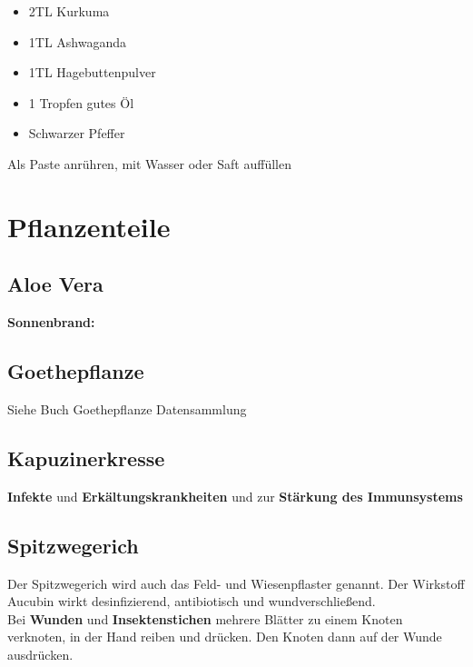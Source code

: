 \begin{itemize}
	\item 2TL Kurkuma
	\item 1TL Ashwaganda
	\item 1TL Hagebuttenpulver
	\item 1 Tropfen gutes Öl
	\item Schwarzer Pfeffer
\end{itemize}

Als Paste anrühren, mit Wasser oder Saft auffüllen



\newpage




\section{Pflanzenteile}


\subsection{Aloe Vera}


\textbf{Sonnenbrand:}


\subsection{Goethepflanze}


Siehe Buch Goethepflanze Datensammlung



\subsection{Kapuzinerkresse}


\textbf{Infekte} und \textbf{Erkältungskrankheiten} und zur \textbf{Stärkung des Immunsystems}

  






\subsection{Spitzwegerich}


Der Spitzwegerich wird auch das Feld- und Wiesenpflaster genannt. Der Wirkstoff Aucubin wirkt desinfizierend, antibiotisch und wundverschließend.\\
Bei \textbf{Wunden} und \textbf{Insektenstichen} mehrere Blätter zu einem Knoten verknoten, in der Hand reiben und drücken. Den Knoten dann auf der Wunde ausdrücken. 

